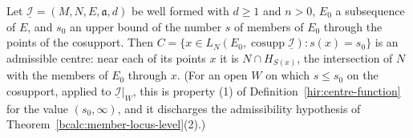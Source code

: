 \begin{proposition}
\label{bcalc:member-locus-centre}
\leanok
Let \(\underline{\mathcal I}=(M,N,E,\mathfrak a,d)\) be well formed with \(d\ge1\) and \(n>0\), \(E_0\) a subsequence of \(E\), and \(s_0\) an upper bound of the number \(s\) of
members of \(E_0\) through the points of the cosupport. Then \(C=\{x\in L_N(E_0,\operatorname{cosupp}\underline{\mathcal I}):s(x)=s_0\}\) is an admissible centre: near
each of its points \(x\) it is \(N\cap H_{S(x)}\), the intersection of \(N\) with the members of \(E_0\) through \(x\). (For an open \(W\) on which \(s\le s_0\) on the cosupport,
applied to \(\underline{\mathcal I}|_W\), this is property (1) of Definition~\ref{hir:centre-function} for the value \((s_0,\infty)\), and it discharges the admissibility
hypothesis of Theorem~\ref{bcalc:member-locus-level}(2).)
\end{proposition}

